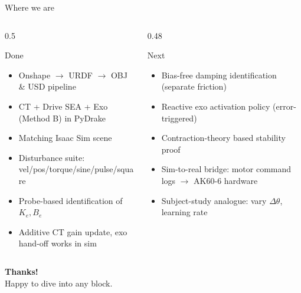 \documentclass[10pt,aspectratio=169]{beamer}
\newcommand{\Ke}{K_e}
\newcommand{\Be}{B_e}
\newcommand{\dth}{\Delta\theta}
\begin{document}
\begin{frame}{Where we are}
\begin{columns}[T,onlytextwidth]
\begin{column}{0.5\textwidth}
\begin{block}{Done}
\begin{itemize}
    \item Onshape $\to$ URDF $\to$ OBJ \& USD pipeline
    \item CT + Drive SEA + Exo (Method B) in PyDrake
    \item Matching Isaac Sim scene
    \item Disturbance suite: vel/pos/torque/sine/pulse/square
    \item Probe-based identification of $\Ke,\Be$
    \item Additive CT gain update, exo hand-off works in sim
\end{itemize}
\end{block}
\end{column}
\begin{column}{0.48\textwidth}
\begin{block}{Next}
\begin{itemize}
    \item Bias-free damping identification (separate friction)
    \item Reactive exo activation policy (error-triggered)
    \item Contraction-theory based stability proof
    \item Sim-to-real bridge: motor command logs $\to$ AK60-6 hardware
    \item Subject-study analogue: vary $\dth$, learning rate
\end{itemize}
\end{block}
\end{column}
\end{columns}
\end{frame}

{
\begin{frame}[plain]
\begin{center}
\vspace*{2cm}
{\color{white}\Huge\bfseries Thanks!}\\[0.5cm]
{\color{white}\large Happy to dive into any block.}
\end{center}
\end{frame}}
\end{document}
